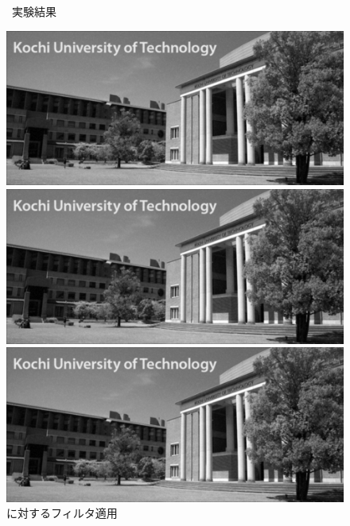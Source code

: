 \begin{figure}[h]
\begin{minipage}[b]{.3\textwidth}
    \end{minipage}
    \caption{\kadaiaa\ 実験結果}
    \begin{minipage}[b]{.49\textwidth}
        \begin{minipage}[b]{.49\textwidth}
            \includegraphics[keepaspectratio,width=\textwidth]{../../Figures/06_21-sf_img_wgn.png}
        \end{minipage}
        \begin{minipage}[b]{.49\textwidth}
            \includegraphics[keepaspectratio,width=\textwidth]{../../Figures/06_23-mf_img_wgn.png}
        \end{minipage}
        \caption{\wgnimg に対するフィルタ適用}
    \end{minipage}
    \begin{minipage}[b]{.49\textwidth}
        \begin{minipage}[b]{.49\textwidth}
            \includegraphics[keepaspectratio,width=\textwidth]{../../Figures/06_22-sf_img_in.png}

\end{minipage}
\end{minipage}
\end{figure}
